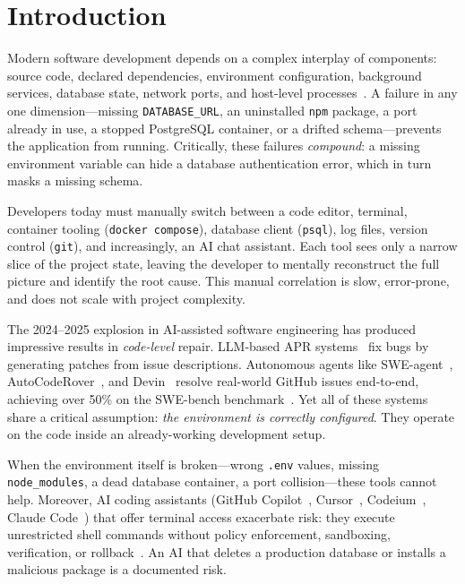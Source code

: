 \documentclass[conference,10pt,caption=false]{IEEEtran}
\begin{document}
\section{Introduction}
\label{sec:intro}

Modern software development depends on a complex interplay of components: source code, declared dependencies, environment configuration, background services, database state, network ports, and host-level processes~\cite{docker2026security, linux2026proc}. A failure in any one dimension---missing \texttt{DATABASE\_URL}, an uninstalled \texttt{npm} package, a port already in use, a stopped PostgreSQL container, or a drifted schema---prevents the application from running. Critically, these failures \textit{compound}: a missing environment variable can hide a database authentication error, which in turn masks a missing schema.

Developers today must manually switch between a code editor, terminal, container tooling (\texttt{docker compose}), database client (\texttt{psql}), log files, version control (\texttt{git}), and increasingly, an AI chat assistant. Each tool sees only a narrow slice of the project state, leaving the developer to mentally reconstruct the full picture and identify the root cause. This manual correlation is slow, error-prone, and does not scale with project complexity.

The 2024--2025 explosion in AI-assisted software engineering has produced impressive results in \textit{code-level} repair. LLM-based APR systems~\cite{llm-apr-survey-2023, llm-apr-survey-2025} fix bugs by generating patches from issue descriptions. Autonomous agents like SWE-agent~\cite{swe-agent}, AutoCodeRover~\cite{autocoderover}, and Devin~\cite{devin} resolve real-world GitHub issues end-to-end, achieving over 50\% on the SWE-bench benchmark~\cite{swe-bench, swebench-verified}. Yet all of these systems share a critical assumption: \textit{the environment is correctly configured}. They operate on the code inside an already-working development setup.

When the environment itself is broken---wrong \texttt{.env} values, missing \texttt{node\_modules}, a dead database container, a port collision---these tools cannot help. Moreover, AI coding assistants (GitHub Copilot~\cite{copilot}, Cursor~\cite{cursor}, Codeium~\cite{codeium}, Claude Code~\cite{claude-code}) that offer terminal access exacerbate risk: they execute unrestricted shell commands without policy enforcement, sandboxing, verification, or rollback~\cite{security-audit, llm-code-security}. An AI that deletes a production database or installs a malicious package is a documented risk.
\end{document}
